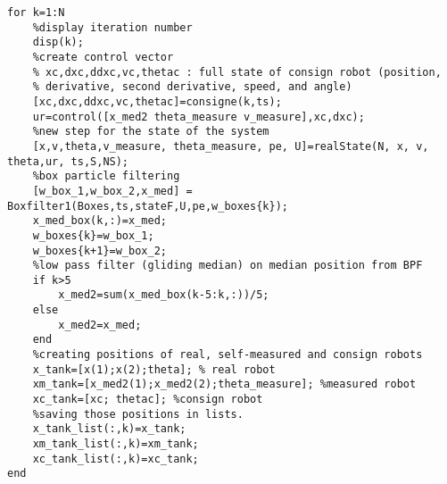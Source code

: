 {\small
\begin{lstlisting}[caption=Main, frame=single]
for k=1:N
    %display iteration number
    disp(k);
    %create control vector
    % xc,dxc,ddxc,vc,thetac : full state of consign robot (position,
    % derivative, second derivative, speed, and angle)
    [xc,dxc,ddxc,vc,thetac]=consigne(k,ts);
    ur=control([x_med2 theta_measure v_measure],xc,dxc);
    %new step for the state of the system
    [x,v,theta,v_measure, theta_measure, pe, U]=realState(N, x, v, theta,ur, ts,S,NS);
    %box particle filtering
    [w_box_1,w_box_2,x_med] = Boxfilter1(Boxes,ts,stateF,U,pe,w_boxes{k});
    x_med_box(k,:)=x_med;
    w_boxes{k}=w_box_1;
    w_boxes{k+1}=w_box_2;
    %low pass filter (gliding median) on median position from BPF
    if k>5
        x_med2=sum(x_med_box(k-5:k,:))/5;
    else
        x_med2=x_med;
    end
    %creating positions of real, self-measured and consign robots
    x_tank=[x(1);x(2);theta]; % real robot
    xm_tank=[x_med2(1);x_med2(2);theta_measure]; %measured robot
    xc_tank=[xc; thetac]; %consign robot
    %saving those positions in lists.
    x_tank_list(:,k)=x_tank;
    xm_tank_list(:,k)=xm_tank;
    xc_tank_list(:,k)=xc_tank;
end
\end{lstlisting}
}
